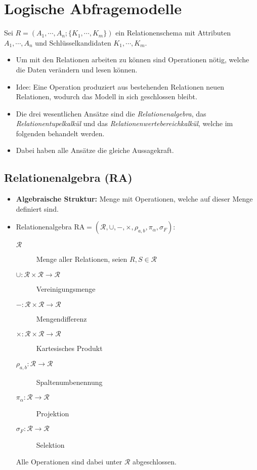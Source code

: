 \chapter{Logische Abfragemodelle} %
    \label{c:logicquery}
    
    Sei \( R = (A_1, \cdots, A_n; \{ K_1, \cdots, K_m \}) \) ein Relationenschema mit Attributen \( A_1, \cdots, A_n \) und Schlüsselkandidaten \( K_1, \cdots, K_m \).
    
    \begin{itemize}
    	\item Um mit den Relationen arbeiten zu können sind Operationen nötig, welche die Daten verändern und lesen können.
    	\item Idee: Eine Operation produziert aus bestehenden Relationen neuen Relationen, wodurch das Modell in sich geschlossen bleibt.
    	\item Die drei wesentlichen Ansätze sind die \textit{Relationenalgebra}, das \textit{Relationentupelkalkül} und das \textit{Relationenwertebereichkalkül}, welche im folgenden behandelt werden.
    	\item Dabei haben alle Ansätze die gleiche Aussagekraft.
    \end{itemize}

    \section{Relationenalgebra (RA)} %
        \begin{itemize}
        	\item \textbf{Algebraische Struktur:} Menge mit Operationen, welche auf dieser Menge definiert sind.
        	\item Relationenalgebra \( \text{RA} = (\mathcal{R}, \cup, -, \times, \rho_{a,b}, \pi_\alpha, \sigma_F) \):
        		\begin{description}
        			\item[\( \mathcal{R} \)] Menge aller Relationen, seien \( R, S \in \mathcal{R} \)
        			\item[\( \cup : \mathcal{R} \times \mathcal{R} \rightarrow \mathcal{R} \)] Vereinigungsmenge
        			\item[\( - : \mathcal{R} \times \mathcal{R} \rightarrow \mathcal{R} \)] Mengendifferenz
        			\item[\( \times : \mathcal{R} \times \mathcal{R} \rightarrow \mathcal{R} \)] Kartesisches Produkt
        			\item[\( \rho_{a,b} : \mathcal{R} \rightarrow \mathcal{R} \)] Spaltenumbenennung
        			\item[\( \pi_\alpha : \mathcal{R} \rightarrow \mathcal{R} \)] Projektion
        			\item[\( \sigma_F : \mathcal{R} \rightarrow \mathcal{R} \)] Selektion
        		\end{description}
        		Alle Operationen sind dabei unter \( \mathcal{R} \) abgeschlossen.
        \end{itemize}

